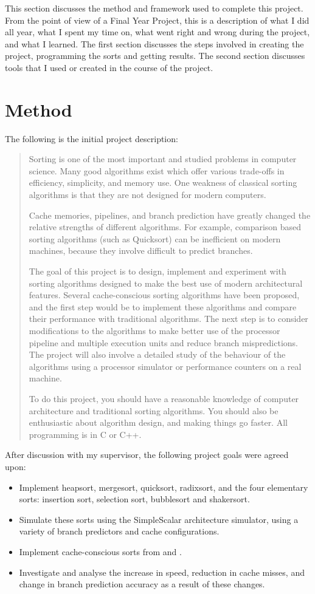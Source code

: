 This section discusses the method and framework used to complete this project.
From the point of view of a Final Year Project, this is a description of what I
did all year, what I spent my time on, what went right and wrong during the
project, and what I learned. The first section discusses the steps involved in
creating the project, programming the sorts and getting results. The second
section discusses tools that I used or created in the course of the project.

\section{Method}

The following is the initial project description:
\begin{quotation}
Sorting is one of the most important and studied problems in computer science.
Many good algorithms exist which offer various trade-offs in efficiency,
simplicity, and memory use.  One weakness of classical sorting algorithms is
that they are not designed for modern computers.

Cache memories, pipelines, and branch prediction have greatly changed the
relative strengths of different algorithms. For example, comparison based
sorting algorithms (such as Quicksort) can be inefficient on modern machines,
because they involve difficult to predict branches.

The goal of this project is to design, implement and experiment with sorting
algorithms designed to make the best use of modern architectural features.
Several cache-conscious sorting algorithms have been proposed, and the first
step would be to implement these algorithms and compare their performance with
traditional algorithms.  The next step is to consider modifications to the
algorithms to make better use of the processor pipeline and multiple execution
units and reduce branch mispredictions. The project will also involve a detailed
study of the behaviour of the algorithms using a processor simulator or
performance counters on a real machine.

To do this project, you should have a reasonable knowledge of computer
architecture and traditional sorting algorithms. You should also be enthusiastic
about algorithm design, and making things go faster.  All programming is in C or
C++.
\end{quotation}
After discussion with my supervisor, the following project goals were agreed upon:
\begin{itemize}
\item Implement heapsort, mergesort, quicksort, radixsort, and the four
elementary sorts: insertion sort, selection sort, bubblesort and shakersort.
\item Simulate these sorts using the SimpleScalar architecture simulator, using a
variety of branch predictors and cache configurations.
\item Implement cache-conscious sorts from \cite{LaMarca96} and
\cite{LaMarca99}.
\item Investigate and analyse the increase in speed, reduction in cache misses, 
and change in branch prediction accuracy as a result of these changes.
\end{itemize}

